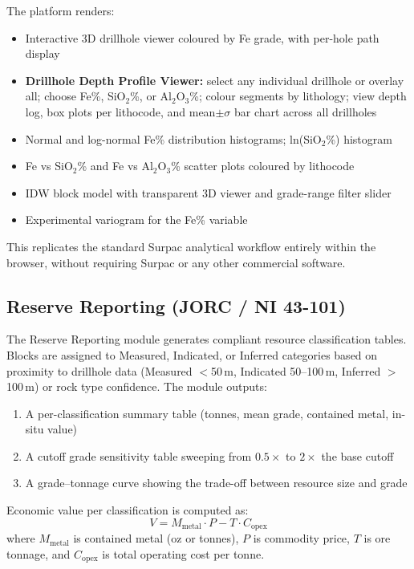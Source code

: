 \documentclass[12pt,a4paper]{article}
\begin{document}
The platform renders:
\begin{itemize}
  \item Interactive 3D drillhole viewer coloured by Fe grade, with per-hole path display
  \item \textbf{Drillhole Depth Profile Viewer:} select any individual drillhole or overlay all; choose Fe\%, SiO$_2$\%, or Al$_2$O$_3$\%; colour segments by lithology; view depth log, box plots per lithocode, and mean$\pm\sigma$ bar chart across all drillholes
  \item Normal and log-normal Fe\% distribution histograms; ln(SiO$_2$\%) histogram
  \item Fe vs SiO$_2$\% and Fe vs Al$_2$O$_3$\% scatter plots coloured by lithocode
  \item IDW block model with transparent 3D viewer and grade-range filter slider
  \item Experimental variogram for the Fe\% variable
\end{itemize}
This replicates the standard Surpac analytical workflow entirely within the browser, without requiring Surpac or any other commercial software.

\subsection{Reserve Reporting (JORC / NI 43-101)}
\label{sec:reserve}

The Reserve Reporting module generates compliant resource classification tables. Blocks are assigned to Measured, Indicated, or Inferred categories based on proximity to drillhole data (Measured $<$50\,m, Indicated 50--100\,m, Inferred $>$100\,m) or rock type confidence. The module outputs:

\begin{enumerate}
  \item A per-classification summary table (tonnes, mean grade, contained metal, in-situ value)
  \item A cutoff grade sensitivity table sweeping from $0.5\times$ to $2\times$ the base cutoff
  \item A grade--tonnage curve showing the trade-off between resource size and grade
\end{enumerate}

Economic value per classification is computed as:
\begin{equation}
  V = M_{\text{metal}} \cdot P - T \cdot C_{\text{opex}}
\end{equation}
where $M_{\text{metal}}$ is contained metal (oz or tonnes), $P$ is commodity price, $T$ is ore tonnage, and $C_{\text{opex}}$ is total operating cost per tonne.
\end{document}
